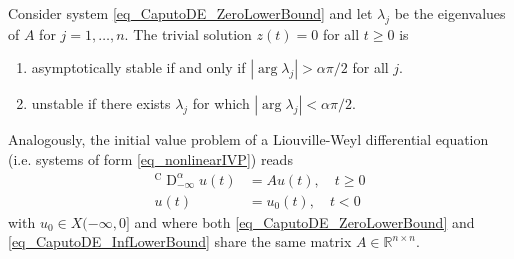 \documentclass{svproc}
\newcommand{\realnumbers}{\mathbb{R}}
\newcommand{\dsomething}[1]{\mathrm{d}#1}
\newcommand{\CderivativeInput}[2]{{}^\mathrm{C}\operatorname{D}_{#2}^{#1}}
\begin{document}
\begin{theorem}
	Consider system \eqref{eq_CaputoDE_ZeroLowerBound} and let $\lambda_j$ be the eigenvalues of $A$ for $j = 1,\dots, n$. The trivial solution $z(t)= 0$ for all $t\geq 0$ is
	\begin{enumerate}[label=(\alph*)]
		\item asymptotically stable if and only if $|\arg \lambda_j|>\alpha \pi/2$ for all $j$.
		\item unstable if there exists $\lambda_j$ for which $|\arg\lambda_j|<\alpha \pi /2$.
	\end{enumerate}
\end{theorem}
Analogously, the initial value problem of a Liouville-Weyl differential equation (i.e. systems of form \eqref{eq_nonlinearIVP}) reads
\begin{subequations}\label{eq_CaputoDE_InfLowerBound}
	\begin{align}
		\CderivativeInput{\alpha}{-\infty} u (t) &= Au(t),\quad t\geq 0\\
		u(t) &= u_0(t),\quad t<0
	\end{align}
\end{subequations}
with $u_0 \in X(-\infty,0]$ and where both \eqref{eq_CaputoDE_ZeroLowerBound} and \eqref{eq_CaputoDE_InfLowerBound} share the same matrix $A\in \realnumbers^{n\times n}$.
\end{document}
